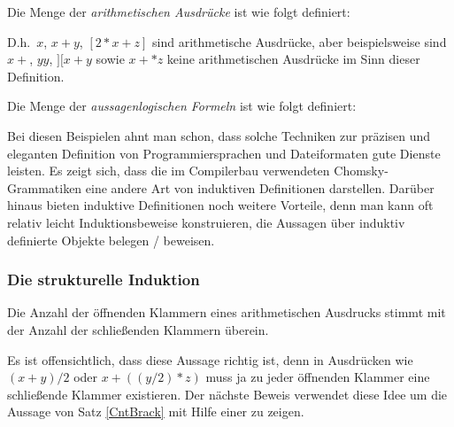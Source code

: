 \begin{example}
\label{induexp}
\noindent Die Menge der \emph{arithmetischen Ausdrücke} ist wie folgt definiert:

\medskip


\medskip

\noindent D.h.~$x$, $x+y$, $[2*x + z]$ sind arithmetische Ausdrücke,
aber beispielsweise sind $x + $, $yy$, $][x+y$ sowie $x +* z$ keine
arithmetischen Ausdrücke im Sinn dieser Definition.
\end{example}

\begin{example}
\label{indubool}
\noindent Die Menge der \emph{aussagenlogischen Formeln} ist wie folgt definiert:

\medskip

\end{example}

Bei diesen Beispielen ahnt man schon, dass solche Techniken zur
präzisen und eleganten Definition von Programmiersprachen und Dateiformaten gute
Dienste leisten. Es zeigt sich, dass die im Compilerbau verwendeten Chomsky-Grammatiken 
eine andere Art von induktiven Definitionen darstellen.  Darüber hinaus bieten induktive Definitionen  
noch weitere Vorteile, denn man kann oft relativ leicht Induktionsbeweise konstruieren, die  
Aussagen über induktiv definierte Objekte belegen / beweisen.

\subsubsection{Die strukturelle Induktion}

\begin{theorem}
\label{CntBrack}
Die Anzahl der öffnenden Klammern eines arithmetischen Ausdrucks stimmt
mit der Anzahl der schließenden Klammern überein.
\end{theorem}

Es ist offensichtlich, dass diese Aussage richtig ist, denn in
Ausdrücken wie $(x + y) / 2$ oder $x + ((y/2) * z)$ muss ja zu jeder
öffnenden Klammer eine schließende Klammer existieren. Der nächste
Beweis verwendet diese Idee um die Aussage von Satz \ref{CntBrack}
mit Hilfe einer 
zu zeigen.

